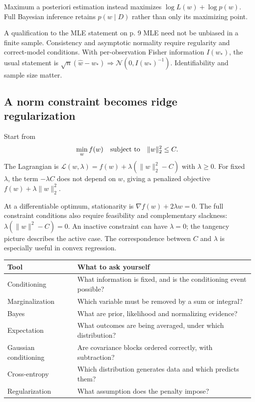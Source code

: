 \documentclass[11pt]{article}
\begin{document}
Maximum a posteriori estimation instead maximizes $\log L(w)+\log p(w)$. Full Bayesian inference retains $p(w\mid D)$ rather than only its maximizing point.
\begin{careful}{A qualification to the MLE statement on p. 9}
MLE need not be unbiased in a finite sample. Consistency and asymptotic normality require regularity and correct-model conditions. With per-observation Fisher information $I(w_*)$, the usual statement is $\sqrt n(\hat w-w_*)\Rightarrow\mathcal N(0,I(w_*)^{-1})$. Identifiability and sample size matter.
\end{careful}
\subsection{A norm constraint becomes ridge regularization}
Start from
\[
\min_w f(w)\quad\hbox{subject to}\quad\|w\|_2^2\leq C.
\]
The Lagrangian is $\mathcal L(w,\lambda)=f(w)+\lambda(\|w\|_2^2-C)$ with $\lambda\geq0$. For fixed $\lambda$, the term $-\lambda C$ does not depend on $w$, giving a penalized objective $f(w)+\lambda\|w\|_2^2$.

At a differentiable optimum, stationarity is $\nabla f(w)+2\lambda w=0$. The full constraint conditions also require feasibility and complementary slackness: $\lambda(\|w\|^2-C)=0$. An inactive constraint can have $\lambda=0$; the tangency picture describes the active case. The correspondence between $C$ and $\lambda$ is especially useful in convex regression.
\begin{longtable}{@{}P{.30\textwidth}P{.61\textwidth}@{}}
\toprule Tool & What to ask yourself\\\midrule\endhead
Conditioning & What information is fixed, and is the conditioning event possible?\\
Marginalization & Which variable must be removed by a sum or integral?\\
Bayes & What are prior, likelihood and normalizing evidence?\\
Expectation & What outcomes are being averaged, under which distribution?\\
Gaussian conditioning & Are covariance blocks ordered correctly, with subtraction?\\
Cross-entropy & Which distribution generates data and which predicts them?\\
Regularization & What assumption does the penalty impose?\\\bottomrule
\end{longtable}
\end{document}
